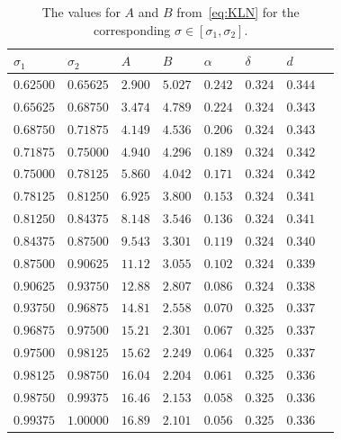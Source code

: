\documentclass[a4paper,reqno]{amsart}
\theoremstyle{definition}
\begin{document}
\begin{table}[h]
\centering
\footnotesize{
\begin{tabular}{llllllll} 
\toprule
$\sigma_1$ & $\sigma_2$ & $A$ & $B$ & $\alpha$ & $\delta$ & $d$ \\ 
\midrule
$0.62500$ & $0.65625$ & $2.900$ & $5.027$ & $0.242$ & $0.324$ & $0.344$ \\
$0.65625$& $0.68750$ & $3.474$ & $4.789$ & $0.224$ & $0.324$ & $0.343$ \\
$0.68750$& $0.71875$ & $4.149$ & $4.536$ & $0.206$ & $0.324$ & $0.343$ \\
$0.71875$ & $0.75000$ & $4.940$ & $4.296$ & $0.189$ & $0.324$ & $0.342$ \\
$0.75000$ & $0.78125$ & $5.860$ & $4.042$ & $0.171$ & $0.324$ & $0.342$ \\
$0.78125$ & $0.81250$ & $6.925$ & $3.800$ & $0.153$ & $0.324$ & $0.341$ \\
$0.81250$ & $0.84375$ & $8.148$ & $3.546$ & $0.136$ & $0.324$ & $0.341$ \\
$0.84375$ & $0.87500$ & $9.543$ & $3.301$ & $0.119$ & $0.324$ & $0.340$ \\
$0.87500$ & $0.90625$ & $11.12$ & $3.055$ & $0.102$ & $0.324$ & $0.339$ \\
$0.90625$ & $0.93750$ & $12.88$ & $2.807$ & $0.086$ & $0.324$ & $0.338$  \\
$0.93750$ & $0.96875$ & $14.81$ & $2.558$ & $0.070$ & $0.325$ & $0.337$ \\
$0.96875$ & $0.97500$ & $15.21$ & $2.301$ & $0.067$ & $0.325$ & $0.337$ \\
$0.97500$ & $0.98125$ & $15.62$ & $2.249$ & $0.064$ & $0.325$ & $0.337$ \\
$0.98125$ &$0.98750$ & $16.04$ & $2.204$ & $0.061$ & $0.325$ & $0.336$ \\
$0.98750$ & $0.99375$ & $16.46$ & $2.153$ & $0.058$ & $0.325$ & $0.336$ \\
$0.99375$ & $1.00000$ & $16.89$ & $2.101$ & $0.056$ & $0.325$ & $0.336$ \\
\bottomrule
\end{tabular}}
\caption{The values for $A$ and $B$ from~\eqref{eq:KLN} for the corresponding $\sigma \in [\sigma_1, \sigma_2]$.}
\label{tab:KLN}
\end{table}









\end{document}
